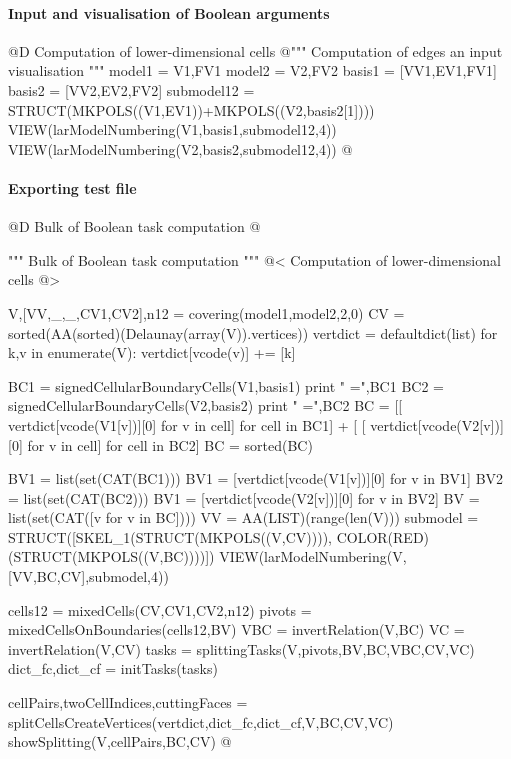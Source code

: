 \documentclass[11pt,oneside]{article}	%
\begin{document}
\paragraph{Input and visualisation of Boolean arguments}

@D Computation of lower-dimensional cells
@{""" Computation of edges an input visualisation """
model1 = V1,FV1
model2 = V2,FV2
basis1 = [VV1,EV1,FV1]
basis2 = [VV2,EV2,FV2]
submodel12 = STRUCT(MKPOLS((V1,EV1))+MKPOLS((V2,basis2[1])))
VIEW(larModelNumbering(V1,basis1,submodel12,4))
VIEW(larModelNumbering(V2,basis2,submodel12,4))
@}

\paragraph{Exporting test file}

@D Bulk of Boolean task computation
@{""" Bulk of Boolean task computation """
@< Computation of lower-dimensional cells @>

V,[VV,_,_,CV1,CV2],n12 = covering(model1,model2,2,0)
CV = sorted(AA(sorted)(Delaunay(array(V)).vertices))
vertdict = defaultdict(list)
for k,v in enumerate(V): vertdict[vcode(v)] += [k]

BC1 = signedCellularBoundaryCells(V1,basis1)
print " =",BC1
BC2 = signedCellularBoundaryCells(V2,basis2)
print " =",BC2
BC = [[ vertdict[vcode(V1[v])][0] for v in cell] for cell in BC1] + [ [ vertdict[vcode(V2[v])][0] for v in cell] for cell in BC2]
BC = sorted(BC)

BV1 = list(set(CAT(BC1)))
BV1 = [vertdict[vcode(V1[v])][0] for v in BV1]
BV2 = list(set(CAT(BC2)))
BV1 = [vertdict[vcode(V2[v])][0] for v in BV2]
BV = list(set(CAT([v for v in BC])))
VV = AA(LIST)(range(len(V)))
submodel = STRUCT([SKEL_1(STRUCT(MKPOLS((V,CV)))), COLOR(RED)(STRUCT(MKPOLS((V,BC))))])
VIEW(larModelNumbering(V,[VV,BC,CV],submodel,4))

cells12 = mixedCells(CV,CV1,CV2,n12)
pivots = mixedCellsOnBoundaries(cells12,BV)
VBC = invertRelation(V,BC)
VC = invertRelation(V,CV)
tasks = splittingTasks(V,pivots,BV,BC,VBC,CV,VC)
dict_fc,dict_cf = initTasks(tasks)

cellPairs,twoCellIndices,cuttingFaces = splitCellsCreateVertices(vertdict,dict_fc,dict_cf,V,BC,CV,VC)
showSplitting(V,cellPairs,BC,CV)
@}
\end{document}
